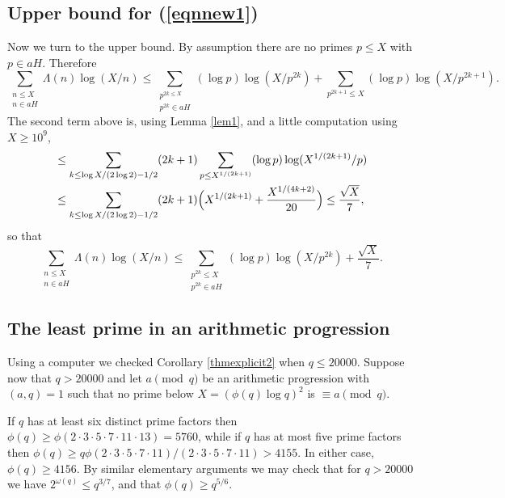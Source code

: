 \documentclass [12pt]{amsart}
\numberwithin{equation}{section}
\begin{document}
  
\subsection{Upper bound for (\ref{eqnnew1})}
  Now we turn to the upper bound.  By assumption there 
are no primes $p\le X$ with $p \in aH$.   Therefore  
\begin{equation*}
\sum_{\substack{n\le X\\ n\in aH}} \Lambda(n) \log (X/n) 
\le \sum_{\substack{p^{2k \le X} \\ p^{2k} \in aH }} (\log p) \log(X/p^{2k})  
+ \sum_{p^{2k+1} \le X } (\log p) \log (X/p^{2k+1}). 
\end{equation*} 
The second term above is, using Lemma \ref{lem1}, and a little computation using $X \ge 10^9$, 
\begin{align*}
\label{eqn4.6}
&\le \sum_{k\le \log X/(2\log 2)-1/2} (2k+1) \sum_{p\le X^{1/(2k+1)}} (\log p) \log (X^{1/(2k+1)}/p) 
\notag \\
&\le \sum_{k\le \log X/(2\log 2)-1/2} (2k+1)\Big (X^{1/(2k+1)} + \frac{X^{1/(4k+2)}}{20}\Big) 
\le \frac{\sqrt{X}}{7},
\end{align*}
so that
\begin{equation}
\label{eqn4.5}
\sum_{\substack{n\le X\\ n\in aH}} \Lambda(n) \log (X/n) 
\le \sum_{\substack{p^{2k} \le X\\ p^{2k} \in aH }} (\log p) \log(X/p^{2k}) + \frac{\sqrt{X}}{7}. 
\end{equation} 


\subsection{The least prime in an arithmetic progression}

\noindent Using a computer we checked Corollary \ref{thmexplicit2} when $q\le 20000$.  
Suppose now that $q>20000$ and let $a\pmod q$ be an arithmetic progression with $(a,q)=1$ such that no prime below $X =(\phi(q) \log q)^2$ is $\equiv a\pmod q$.  

If $q$ has at least six distinct prime factors 
then $\phi(q) \ge \phi(2\cdot 3\cdot 5\cdot 7\cdot 11\cdot 13) = 5760$, 
while if $q$ has at most five prime factors then $\phi(q)\ge q \phi(2\cdot 3\cdot 5\cdot 7\cdot 11)/(2\cdot 3\cdot 5\cdot 7\cdot 11) 
>4155$.   In either case, $\phi(q) \ge 4156$.  By similar elementary arguments 
we may check that for $q>20000$ we have $2^{\omega(q)} \le q^{3/7}$, and that $\phi(q) \ge q^{5/6}$.  
\end{document}
